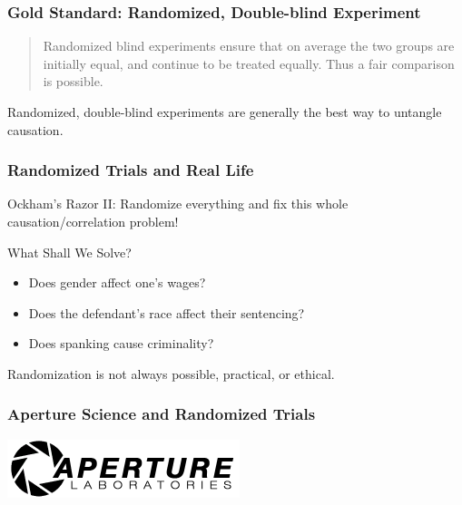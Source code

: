 \documentclass[handout]{beamer}
\begin{document}
\begin{frame}
\frametitle{Gold Standard: Randomized, Double-blind Experiment}
	\begin{quote}
		Randomized blind experiments ensure that on average the two groups are initially equal, and continue to be treated equally. Thus a fair comparison is possible.
	\end{quote}
	
	\vspace{2em}
	\begin{alertblock}{Randomized, double-blind experiments are generally the best way to untangle causation.}
	\end{alertblock}
\end{frame}

\begin{frame}
\frametitle{Randomized Trials and Real Life}
	\alert{Ockham's Razor II:} Randomize everything and fix this whole causation/correlation problem!
	\begin{block}{What Shall We Solve?}
		\begin{itemize}[<+->]
			\item Does gender affect one's wages?
			\item Does the defendant's race affect their sentencing?
			\item Does spanking cause criminality?
		\end{itemize}
	\end{block}
\end{frame}

\begin{frame}
	\Huge{Randomization is not always possible, practical, or ethical.}
\end{frame}

\begin{frame}
	\frametitle{Aperture Science and Randomized Trials}
	\begin{center}
		\includegraphics[scale=1]{./images/aperture.png}
	\end{center}
	\href{run:./sound/Cave_Johnson_mandatory_testing.wav}{}
	\href{run:./sound/Cave_Johnson_control1.wav}{}
	\href{run:./sound/Cave_Johnson_control2.wav}{}
\end{frame}
\end{document}
